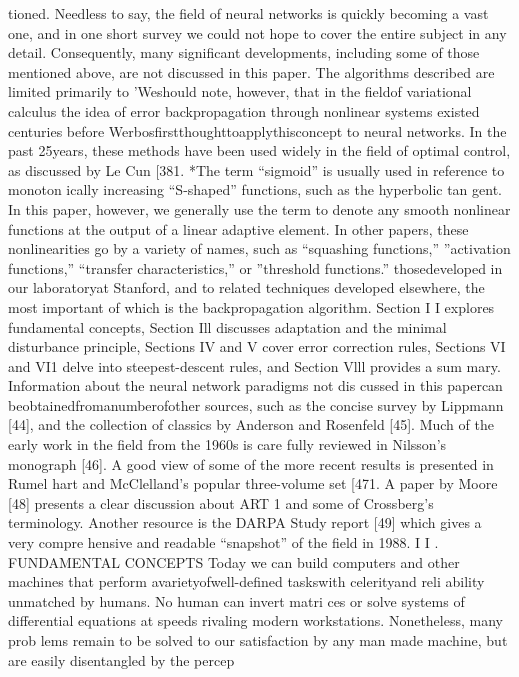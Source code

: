 \documentclass[11pt,a4paper,twocolumn]{article}
\begin{document}
tioned. Needless to say, the field of neural networks is 
quickly becoming a vast one, and in one short survey we 
could not hope to cover the entire subject in any detail. 
Consequently, many significant developments, including 
some of those mentioned above, are not discussed in this 
paper. The algorithms described are limited primarily to 
’Weshould note, however, that in the fieldof variational calculus 
the idea of error backpropagation through nonlinear systems 
existed centuries before Werbosfirstthoughttoapplythisconcept 
to neural networks. In the past 25years, these methods have been 
used widely in the field of optimal control, as discussed by Le Cun 
[381. 
*The term “sigmoid” is usually used in reference to monoton
ically increasing “S-shaped” functions, such as the hyperbolic tan
gent. In this paper, however, we generally use the term to denote 
any smooth nonlinear functions at the output of a linear adaptive 
element. In other papers, these nonlinearities go by a variety of 
names, such as “squashing functions,” ”activation functions,” 
“transfer characteristics,” or ”threshold functions.” 
thosedeveloped in our laboratoryat Stanford, and to related 
techniques developed elsewhere, the most important of 
which is the backpropagation algorithm. Section I I  explores 
fundamental concepts, Section Ill discusses adaptation and 
the minimal disturbance principle, Sections IV and V cover 
error correction rules, Sections VI and VI1 delve into 
steepest-descent rules, and Section Vlll provides a sum
mary. 
Information about the neural network paradigms not dis
cussed in this papercan beobtainedfromanumberofother 
sources, such as the concise survey by Lippmann [44], and 
the collection of classics by Anderson and Rosenfeld [45]. 
Much of the early work in the field from the 1960s is care
fully reviewed in Nilsson’s monograph [46]. A good view 
of some of the more recent results is presented in Rumel
hart and McClelland’s popular three-volume set [471. A 
paper by Moore [48] presents a clear discussion about ART 
1 and some of Crossberg’s terminology. Another resource 
is the DARPA Study report [49] which gives a very compre
hensive and readable “snapshot” of the field in 1988. 
I I .  
FUNDAMENTAL CONCEPTS 
Today we can build computers and other machines that 
perform avarietyofwell-defined taskswith celerityand reli
ability unmatched by humans. No human can invert matri
ces or solve systems of differential equations at speeds 
rivaling modern workstations. Nonetheless, many prob
lems remain to be solved to our satisfaction by any man
made machine, but are easily disentangled by the percep
\end{document}
